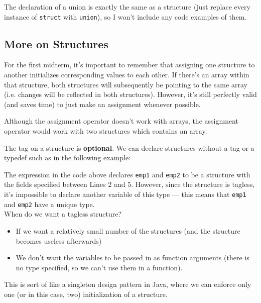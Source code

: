 The declaration of a union is exactly the same as a structure (just replace every instance of \verb!struct! with \verb!union!), so I won't include any code examples of them.


\subsection{More on Structures}

For the first midterm, it's important to remember that assigning one structure to another initializes corresponding values to each other. If there's an array within that structure, both structures will subsequently be pointing to the same array (i.e. changes will be reflected in both structures). However, it's still perfectly valid (and saves time) to just make an assignment whenever possible.  


Although the assignment operator doesn't work with arrays, the assignment operator would work with two structures which contains an array. 


The tag on a structure is \textbf{optional}. We can declare structures without a tag or a typedef such as in the following example:

\lstset{
caption=Tagless Structure
}
\begin{center}
\label{Tagless Structure}
\end{center}

The expression in the code above declares \verb!emp1! and \verb!emp2! to be a structure with the fields specified between Lines $2$ and $5$. However, since the structure is tagless, it's impossible to declare another variable of this type --- this means that \verb!emp1! and \verb!emp2! have a unique type. \\


When do we want a tagless structure? \begin{itemize}
    \item If we want a relatively small number of the structures (and the structure becomes useless afterwards)
    \item We don't want the variables to be passed in as function arguments (there is no type specified, so we can't use them in a function). 
\end{itemize}

This is sort of like a singleton design pattern in Java, where we can enforce only one (or in this case, two) initialization of a structure. 
